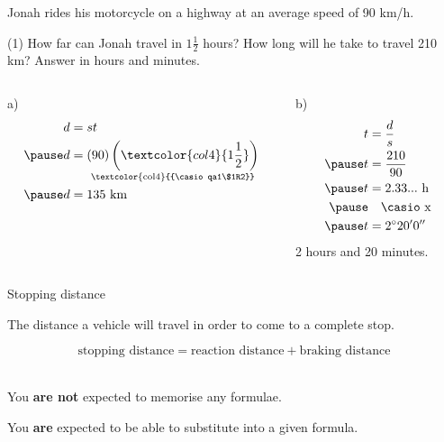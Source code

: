 \documentclass[aspectratio=169,10pt]{beamer}
\begin{document}
\begin{frame}
  \begin{example}
    Jonah rides his motorcycle on a highway at an average speed of 90 km/h.
    \begin{tasks}(1)
      \task How far can Jonah travel in $1\frac{1}{2}$ hours?
      \task How long will he take to travel 210 km? Answer in hours and minutes.
    \end{tasks}
  \end{example}\pause
  \begin{solution}[]
  \vspace{-1em}
  \begin{columns}[t]
      \begin{column}{.44\textwidth}
        a)\vspace{-1em}
        \[
        \begin{aligned}
          d&=st\\\pause
          d&=\underset{\text{\textcolor{col4}{{\casio qa1\$1R2}}}}{(90)\left(\textcolor{col4}{1\frac{1}{2}}\right)}\\\pause
          d&=135\text{ km}
        \end{aligned}
        \]
      \end{column}
      \begin{column}{.44\textwidth}
        b)\vspace{-1em}
        \[
        \begin{aligned}
          t&=\frac{d}{s}\\\pause
          t&=\frac{210}{90}\\\pause
          t&=2.33...\text{ h}\\\pause
          &\quad\text{\casio x}\\\pause
          t&=2^\circ 20' 0''
        \end{aligned}
        \]
        2 hours and 20 minutes.
      \end{column}
  \end{columns}
  \end{solution}
\end{frame}

\begin{frame}{Stopping distance}
    \begin{definition}
    The distance a vehicle will travel in order to come to a complete stop.
    \end{definition}\pause
    $$\text{stopping distance}=\text{reaction distance}+\text{braking distance}$$\\\pause\vspace{1em}
    \begin{important}
    You \textbf{are not} expected to memorise any formulae.\pause
    
    You \textbf{are} expected to be able to substitute into a given formula.
    \end{important}
\end{frame}
\end{document}
